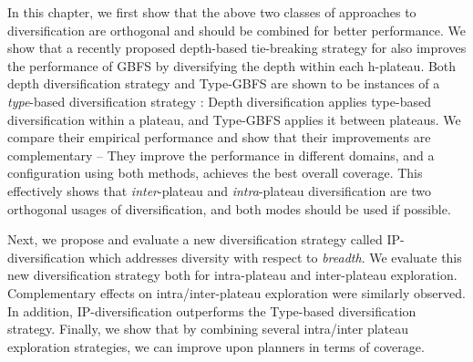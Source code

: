 In this chapter, we first show that  the above two classes of approaches to diversification are orthogonal and should be combined for better performance.
We show that a recently proposed depth-based tie-breaking strategy for \astar \cite{Asai2016} also improves the performance of GBFS by diversifying the depth within each h-plateau.
Both depth diversification strategy and Type-GBFS are shown to be instances of a \emph{type}-based diversification strategy \cite{xie14type}: Depth diversification applies type-based diversification within a plateau, and Type-GBFS applies it between plateaus.
We compare their empirical performance and show that their improvements are complementary -- 
They improve the performance in different domains, and a configuration using both methods, achieves the best overall coverage.
This effectively shows that \emph{inter}-plateau and \emph{intra}-plateau diversification are two orthogonal usages of diversification, and both modes should be used if possible.
 
Next, we propose and evaluate a new diversification strategy called IP-diversification which addresses diversity with respect to \emph{breadth}.
We evaluate this new diversification strategy both for intra-plateau and inter-plateau exploration.
Complementary effects on intra/inter-plateau exploration were similarly observed. In addition, IP-diversification outperforms the Type-based diversification strategy.
Finally, we show that by combining several intra/inter plateau exploration strategies, we can improve upon \lsota planners in terms of coverage.

